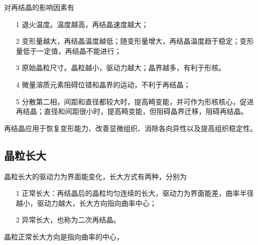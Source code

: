             对再结晶的影响因素有
            \begin{itemize}
                \item[1] 退火温度。温度越高，再结晶速度越大；
                \item[2] 变形量越大，再结晶温度越低；随变形量增大，再结晶温度趋于稳定；变形量低于一定值，再结晶不能进行；
                \item[3] 原始晶粒尺寸。晶粒越小，驱动力越大；晶界越多，有利于形核。
                \item[4] 微量溶质元素阻碍位错和晶界的运动，不利于再结晶；
                \item[5] 分散第二相，间距和直径都较大时，提高畸变能，并可作为形核核心，促进再结晶；直径和间距很小时，提高畸变能，但阻碍晶界迁移，阻碍再结晶。
            \end{itemize}

            再结晶应用于恢复变形能力、改善显微组织、消除各向异性以及提高组织稳定性。
        \subsection{晶粒长大}
            晶粒长大的驱动力为界面能变化，长大方式有两种，分别为
            \begin{itemize}
                \item[1] 正常长大：再结晶后的晶粒均匀连续的长大，驱动力为界面能差，曲率半径越小，驱动力越大，长大方向指向曲率中心；
                \item[2] 异常长大，也称为二次再结晶。
            \end{itemize}

            晶粒正常长大方向是指向曲率的中心，